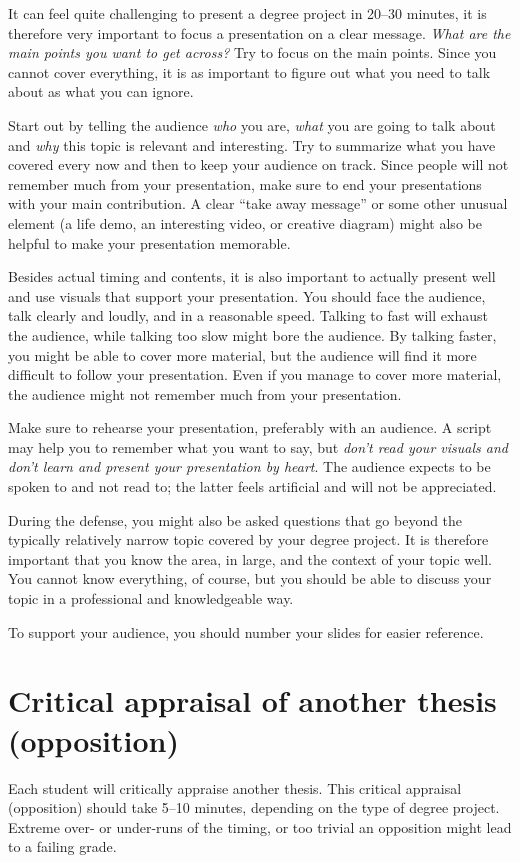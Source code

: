 \documentclass[a4paper,12pt]{book}
\begin{document}
It can feel quite challenging to present a degree project in 20--30
minutes, it is therefore very important to focus a presentation on a clear
message. \textit{What are the main points you want to get across?}
Try to focus on the main points. Since you cannot cover everything, it is
as important to figure out what you need to talk about as what you can
ignore.

Start out by telling the audience \textit{who} you are, \textit{what} you
are going to talk about and \textit{why} this topic is relevant and interesting.
Try to summarize what you have covered every now and then to keep your
audience on track. Since people will not remember much from your presentation,
make sure to end your presentations with your main contribution. A clear
``take away message'' or some other unusual element (a life demo, an
interesting video, or creative diagram) might also be helpful to make your
presentation memorable.

Besides actual timing and contents, it is also important to actually present
well and use visuals that support your presentation. You should face the
audience, talk clearly and loudly, and in a reasonable speed. Talking to fast
will exhaust the audience, while talking too slow might bore the audience.
By talking faster, you might be able to cover more material, but the audience
will find it more difficult to follow your presentation. Even if you manage to
cover more material, the audience might not remember much from your
presentation.

Make sure to rehearse your presentation, preferably with an audience.
A script may help you to remember what you want to say, but \textit{don't
read your visuals and don't learn and present your presentation by heart}.
The audience expects to be spoken to and not read to; the latter feels
artificial and will not be appreciated.

During the defense, you might also be asked questions that go beyond the
typically relatively narrow topic covered by your degree project. It is therefore
important that you know the area, in large, and the context of your topic well.
You cannot know everything, of course, but you should be able to discuss your
topic in a professional and knowledgeable way.

To support your audience, you should number your slides for easier reference.


\chapter{Critical appraisal of another thesis (opposition)}
\label{chp:opposition}
%
Each student will critically appraise another thesis. This critical
appraisal (opposition) should take 5--10 minutes, depending on the type of degree project.
Extreme over- or under-runs of the timing, or too trivial an opposition might lead to a failing grade.
\end{document}
